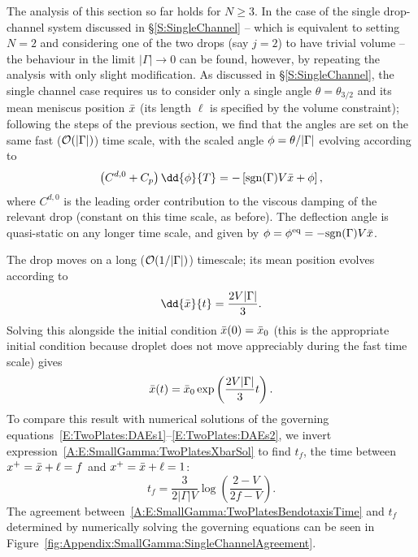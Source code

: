 \begin{subappendices}
The analysis of this section so far holds for $N\geq 3$. In the case of the single drop-channel system discussed in \S\ref{S:SingleChannel} -- which is equivalent to setting $N=2$ and considering one of the two drops (say $j = 2$) to have trivial volume --
the behaviour in the limit $|\Gamma|\to 0$ can be found, however, by repeating the analysis with only slight modification. As discussed in \S\ref{S:SingleChannel}, the single channel case requires us to consider only a single angle $\theta = \theta_{3/2}$ and its mean meniscus position $\bar{x}$ (its length $\ell$ is specified by the volume constraint); following the steps of the previous section, we find that the angles are set on the same fast ($\mathcal{O}(|\Gamma|)$) time scale, with the scaled angle $\phi = \theta/|\Gamma|$ evolving according to
\begin{equation}\label{A:E:SmallGamma:TwoPlates:ShortTime}
\left(C^{d,0} + C_p\right)\dd{\phi}{T} =-\left[ \sgn(\Gamma)V\xbar+ \phi\right],
\end{equation}
where $C^{d,0}$ is the leading order contribution to the viscous damping of the relevant drop (constant on this time scale, as before). The deflection angle is quasi-static on any longer time scale, and given by $\phi = \phi^{\text{eq}} = -\mathrm{sgn}(\Gamma)V\bar{x}$.

The drop moves on a long ($\mathcal{O}(1/|\Gamma|)$) timescale; its mean position evolves according to
\begin{equation}
\dd{\xbar}{t} = \frac{2V|\Gamma|}{3}.
\end{equation}
Solving this alongside the initial condition $\bar{x}(0) = \bar{x}_0$ (this is the appropriate initial condition because droplet does not move appreciably during the fast time scale) gives
\begin{equation}\label{A:E:SmallGamma:TwoPlatesXbarSol}
\bar{x}(t) = \bar{x}_0 \exp\left(\frac{2V|\Gamma|}{3}t\right).
\end{equation}
To compare this result with numerical solutions of the governing equations~\eqref{E:TwoPlates:DAEs1}--\eqref{E:TwoPlates:DAEs2}, we invert expression~\eqref{A:E:SmallGamma:TwoPlatesXbarSol} to find $t_f$, the time between $x^+ = \bar{x} + \ell = f$ and $x^+ = \bar{x} + \ell = 1$:
\begin{equation}\label{A:E:SmallGamma:TwoPlatesBendotaxisTime}
t_f = \frac{3}{2|\Gamma|V}\log \left(\frac{2-V}{2f-V}\right).
\end{equation}
The agreement between~\eqref{A:E:SmallGamma:TwoPlatesBendotaxisTime} and $t_f$ determined by numerically solving the governing equations can be seen in Figure~\ref{fig:Appendix:SmallGamma:SingleChannelAgreement}.



\end{subappendices}
